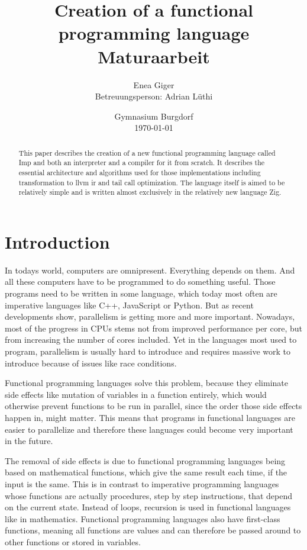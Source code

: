 \documentclass[12pt]{article}
\title{Creation of a functional programming language\\Maturaarbeit}
\author{Enea Giger\\Betreuungsperson: Adrian Lüthi}
\date{Gymnasium Burgdorf\\\today}
\begin{document}
\maketitle
\begin{abstract}
	This paper describes the creation of a new functional programming language called Imp
	and both an interpreter and a compiler for it from scratch.
	It describes the essential architecture and algorithms used for those
	implementations including transformation to \Gls{llvm} \gls{ir} and tail call optimization.
	The language itself is aimed to be relatively simple
	and is written almost exclusively in the relatively new language
	Zig.
\end{abstract}
\newpage


\tableofcontents
\newpage

\section{Introduction}
In todays world, computers are omnipresent. Everything depends on them.
And all these computers have to be programmed to do something useful.
Those programs need to be written in some language, which today most
often are imperative languages like C++, JavaScript or Python.
But as recent developments show, parallelism is getting more
and more important. Nowadays, most of the progress in CPUs stems not from
improved performance per core, but from increasing the number of cores included.
Yet in the languages most used to program, parallelism is usually hard to introduce
and requires massive work to introduce because of issues like race conditions.

Functional programming languages solve this problem, because they eliminate side effects
like mutation of variables in a function entirely, which would otherwise prevent functions to be run in
parallel, since the order those side effects happen in, might matter.
This means that programs in functional languages are easier to parallelize and therefore
these languages could become very important in the future.

The removal of side effects is due to functional programming languages being based
on mathematical functions, which give the same result each time, if the input is the same.
This is in contrast to imperative programming languages whose functions are
actually procedures, step by step instructions, that depend on the current state.
Instead of loops, recursion is used in functional languages like in mathematics.
Functional programming languages also have first-class functions, meaning
all functions are values and can therefore be passed around to other functions
or stored in variables.
\end{document}
